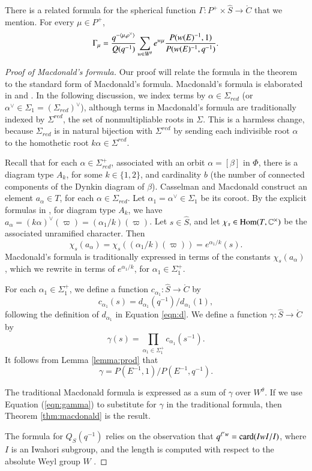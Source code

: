 There is a related formula for the spherical function
$\Gamma:P^+\times\hat S\to\ring{C}$ that we mention.  For every
$\mu\in P^+$,
\begin{equation} 
\Gamma_\mu = 
\frac{q^{-\langle{\mu,\rho^\vee}\rangle}}{ Q(q^{-1})} 
\sum_{w\in W^\theta} e^{w\mu} \frac{P(w(E)^{-1},1)}{P(w(E)^{-1},q^{-1})}.
\end{equation}

\begin{proof}[Proof of Macdonald's formula]
  Our proof will relate the formula in the theorem to the standard
  form of Macdonald's formula.  Macdonald's formula is elaborated in
  \cite{casselman1980unramified} and \cite{casselman2005companion}.
  In the following discussion, we index terms by
  $\alpha\in\Sigma_{red}$ (or $\alpha^\vee\in \Sigma_1 =
  (\Sigma_{red})^\vee$), although terms in Macdonald's formula are
  traditionally indexed by $\Sigma^{red}$, the set of nonmultipliable
  roots in $\Sigma$.  This is a harmless change, because
  $\Sigma_{red}$ is in natural bijection with $\Sigma^{red}$ by
  sending each indivisible root $\alpha$ to the homothetic root
  $k\alpha\in\Sigma^{red}$.

  Recall that for each $\alpha\in \Sigma^+_{red}$, associated with an
  orbit $\alpha=[\beta]$ in $\Phi$, there is a diagram type $A_k$, for
  some $k\in\{1,2\}$, and cardinality $b$ (the number of connected
  components of the Dynkin diagram of $\beta$).  Casselman and
  Macdonald construct an element $a_{\alpha}\in T$, for each
  $\alpha\in\Sigma_{red}$.  Let $\alpha_1 = \alpha^\vee\in \Sigma_1$
  be its coroot.  By the explicit formulas in
  \cite{casselman2005companion}, for diagram type $A_k$, we have
  $a_\alpha = (k\alpha)^\vee(\varpi) = (\alpha_1/k)(\varpi)$.  Let
  $s\in \hat S$, and let $\chi_s\in{\operatorname{Hom}}(T,\mathbb{C}^\times)$ be the
  associated unramified character.  Then
\[
\chi_s(a_{\alpha}) = \chi_s((\alpha_1/k)(\varpi)) = e^{\alpha_1/k}(s).
\]
Macdonald's formula is traditionally expressed in terms of the
constants $\chi_s(a_\alpha)$, which we rewrite in terms of
$e^{\alpha_1/k}$, for $\alpha_1\in\Sigma^+_1$.

For each $\alpha_1\in\Sigma^+_1$, we define a function
$c_{\alpha_1}:\hat S\to\ring{C}$ by
\[
c_{\alpha_1}(s) = d_{\alpha_1}(q^{-1})/d_{\alpha_1}(1),
\]
following the definition of $d_{\alpha_1}$ in Equation \ref{eqn:d}.
We define a function $\gamma:\hat S\to \ring{C}$ by
\[
\gamma(s)  = \prod_{\alpha_1\in \Sigma^+_1} c_{\alpha_1}(s^{-1}).
\]
It follows from Lemma \ref{lemma:prod} that
\begin{equation}\label{eqn:gamma}
\gamma = P(E^{-1},1)/P(E^{-1},q^{-1}).
\end{equation}

The traditional Macdonald formula is expressed as a sum of $\gamma$
over $W^\theta$.  If we use Equation (\ref{eqn:gamma}) to substitute
for $\gamma$ in the traditional formula, then Theorem
\ref{thm:macdonald} is the result.

The formula for $Q_S(q^{-1})$ relies on the observation that $q^{\ell'
  w} = {\operatorname{card}}(IwI/I)$, where $I$ is an Iwahori subgroup, and the
length is computed with respect to the absolute Weyl group $W$
\cite[p.74]{carter1985finite}.
\end{proof}


